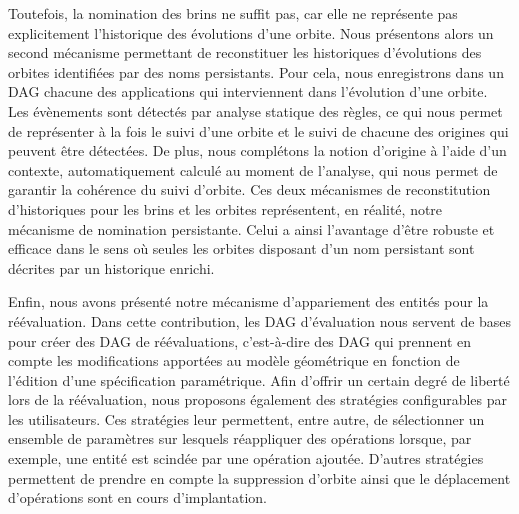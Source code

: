 Toutefois, la nomination des brins ne suffit pas, car elle ne représente pas
explicitement l'historique des évolutions d'une orbite. %
Nous présentons alors un second mécanisme permettant de reconstituer les
historiques d'évolutions des orbites identifiées par des noms persistants. %
Pour cela, nous enregistrons dans un DAG chacune des applications qui
interviennent dans l'évolution d'une orbite. %
Les évènements sont détectés par analyse statique des règles, ce qui nous permet
de représenter à la fois le suivi d'une orbite et le suivi de chacune des
origines qui peuvent être détectées. %
De plus, nous complétons la notion d'origine à l'aide d'un contexte,
automatiquement calculé au moment de l'analyse, qui nous permet de garantir la
cohérence du suivi d'orbite. %
Ces deux mécanismes de reconstitution d'historiques pour les brins et les
orbites représentent, en réalité, notre mécanisme de nomination persistante. %
Celui a ainsi l'avantage d'être robuste et efficace dans le sens où seules les
orbites disposant d'un nom persistant sont décrites par un historique enrichi. %

Enfin, nous avons présenté notre mécanisme d'appariement des entités pour la
réévaluation. %
Dans cette contribution, les DAG d'évaluation nous servent de bases pour créer
des DAG de réévaluations, c'est-à-dire des DAG qui prennent en compte les
modifications apportées au modèle géométrique en fonction de l'édition d'une
spécification paramétrique. %
Afin d'offrir un certain degré de liberté lors de la réévaluation, nous
proposons également des stratégies configurables par les utilisateurs. %
Ces stratégies leur permettent, entre autre, de sélectionner un ensemble de
paramètres sur lesquels réappliquer des opérations lorsque, par exemple, une
entité est scindée par une opération ajoutée. %
D'autres stratégies permettent de prendre en compte la suppression d'orbite
ainsi que le déplacement d'opérations sont en cours d'implantation. %


